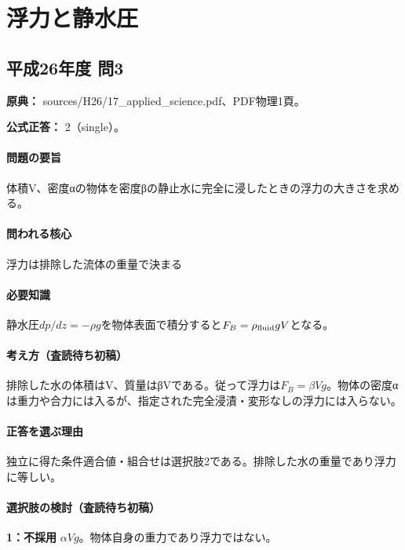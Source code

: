 \section{浮力と静水圧}

\subsection{平成26年度 問3}
\label{q:h26-reg-applied-03}

\noindent\textbf{原典：} sources/H26/17\_applied\_science.pdf、PDF物理1頁。

\textbf{公式正答：} 2（single）。

\paragraph{問題の要旨} 体積V、密度αの物体を密度βの静止水に完全に浸したときの浮力の大きさを求める。

\paragraph{問われる核心} 浮力は排除した流体の重量で決まる

\paragraph{必要知識} 静水圧\(dp/dz=-\rho g\)を物体表面で積分すると\(F_B=\rho_{\rm fluid}gV\)となる。

\paragraph{考え方（査読待ち初稿）} 排除した水の体積はV、質量はβVである。従って浮力は\(F_B=\beta Vg\)。物体の密度αは重力や合力には入るが、指定された完全浸漬・変形なしの浮力には入らない。

\paragraph{正答を選ぶ理由} 独立に得た条件適合値・組合せは選択肢2である。排除した水の重量であり浮力に等しい。

\paragraph{選択肢の検討（査読待ち初稿）}

\noindent\textbf{1：不採用} \(\alpha Vg\)。物体自身の重力であり浮力ではない。\par

